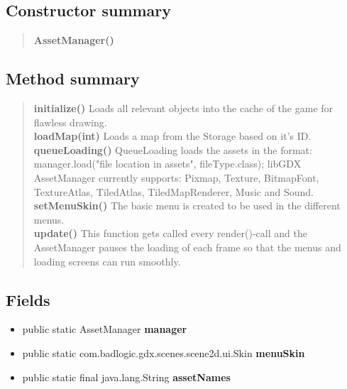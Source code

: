 \documentclass[11pt,a4paper]{report}
\begin{document}
{{\subsection{Constructor summary}{
\begin{verse}
{\bf AssetManager()} \\
\end{verse}
}
\subsection{Method summary}{
\begin{verse}
{\bf initialize()} Loads all relevant objects into the cache of the game for flawless drawing.\\
{\bf loadMap(int)} Loads a map from the Storage based on it's ID.\\
{\bf queueLoading()} QueueLoading loads the assets in the format: manager.load("file location in assets", fileType.class); libGDX AssetManager currently supports: Pixmap, Texture, BitmapFont, TextureAtlas, TiledAtlas, TiledMapRenderer, Music and Sound.\\
{\bf setMenuSkin()} The basic menu is created to be used in the different menus.\\
{\bf update()} This function gets called every render()-call and the AssetManager pauses the loading of each frame so that the menus and loading screens can run smoothly.\\
\end{verse}
}
\subsection{Fields}{
\begin{itemize}
\item{
\label{com.retroMachines.data.AssetManager.manager}public static AssetManager {\bf  manager}
}
\item{
\label{com.retroMachines.data.AssetManager.menuSkin}public static com.badlogic.gdx.scenes.scene2d.ui.Skin {\bf  menuSkin}
}
\item{
\label{com.retroMachines.data.AssetManager.assetNames}public static final java.lang.String {\bf  assetNames}
}
\end{itemize}
}
}}
\end{document}
